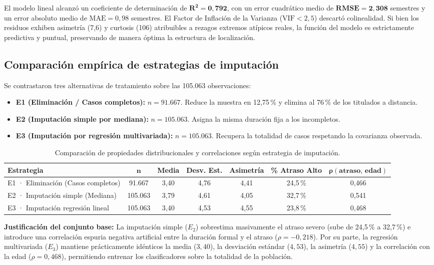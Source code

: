 \documentclass[11pt,a4paper]{article}
\begin{document}
El modelo lineal alcanzó un coeficiente de determinación de $\mathbf{R^2 = 0{,}792}$, con un error cuadrático medio de $\mathbf{\text{RMSE} = 2{,}308}$ semestres y un error absoluto medio de $\text{MAE} = 0{,}98$ semestres. El Factor de Inflación de la Varianza ($\text{VIF} < 2,5$) descartó colinealidad. Si bien los residuos exhiben asimetría (7,6) y curtosis (106) atribuibles a rezagos extremos atípicos reales, la función del modelo es estrictamente predictiva y puntual, preservando de manera óptima la estructura de localización.

\subsection{Comparación empírica de estrategias de imputación}
Se contrastaron tres alternativas de tratamiento sobre las 105.063 observaciones:
\begin{itemize}[leftmargin=*]
\item \textbf{E1 (Eliminación / Casos completos):} $n = 91.667$. Reduce la muestra en 12,75\,\% y elimina al 76\,\% de los titulados a distancia.
\item \textbf{E2 (Imputación simple por mediana):} $n = 105.063$. Asigna la misma duración fija a los incompletos.
\item \textbf{E3 (Imputación por regresión multivariada):} $n = 105.063$. Recupera la totalidad de casos respetando la covarianza observada.
\end{itemize}

\begin{table}[h!]
\centering
\small
\caption{Comparación de propiedades distribucionales y correlaciones según estrategia de imputación.}
\begin{tabular}{lcccccc}
\toprule
\textbf{Estrategia} & $\mathbf{n}$ & \textbf{Media} & \textbf{Desv. Est.} & \textbf{Asimetría} & \textbf{\% Atraso Alto} & $\mathbf{\rho(\text{atraso, edad})}$ \\
\midrule
E1 · Eliminación (Casos completos) & 91.667 & 3,40 & 4,76 & 4,41 & 24,5\,\% & 0,466 \\
E2 · Imputación simple (Mediana)    & 105.063 & 3,79 & 4,61 & 4,05 & 32,7\,\% & 0,541 \\
E3 · Imputación regresión lineal    & 105.063 & 3,40 & 4,53 & 4,55 & 23,8\,\% & 0,468 \\
\bottomrule
\end{tabular}
\end{table}

\textbf{Justificación del conjunto base:} La imputación simple ($E_2$) sobrestima masivamente el atraso severo (sube de 24,5\,\% a 32,7\,\%) e introduce una correlación espuria negativa artificial entre la duración formal y el atraso ($\rho = -0,218$). Por su parte, la regresión multivariada ($E_3$) mantiene prácticamente idénticos la media ($3,40$), la desviación estándar ($4,53$), la asimetría ($4,55$) y la correlación con la edad ($\rho = 0,468$), permitiendo entrenar los clasificadores sobre la totalidad de la población.
\end{document}
